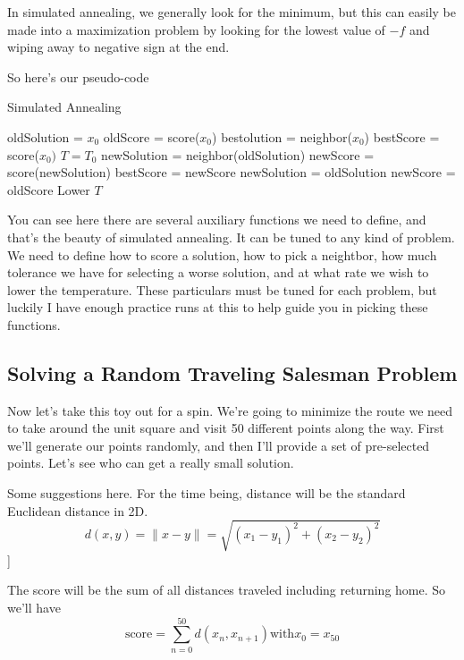 \documentclass{article}
\theoremstyle{definition}
\theoremstyle{remark}
\begin{document}
In simulated annealing, we generally look for the minimum, but this can easily be made into a maximization problem by looking for the lowest value of $-f$ and wiping away to negative sign at the end.


So here's our pseudo-code
\begin{algorithm}
	\caption{Simulated Annealing}
	\label{SA}
	\begin{algorithmic}[1]
		\State oldSolution = $x_0$
		\State oldScore = score($x_0$)
		\State bestolution = neighbor($x_0$)
		\State bestScore = score($x_0)$
		\State $T = T_0$
		\State newSolution = neighbor(oldSolution)
		\State newScore = score(newSolution)
	    \State bestScore = newScore
	    \EndIf
	    \State newSolution = oldSolution
	    \State newScore = oldScore
	    \EndIf
	    \EndFor
	    \State Lower $T$
	    \EndWhile
		\EndProcedure
	\end{algorithmic}	
\end{algorithm}   


You can see here there are several auxiliary functions we need to define, and that's the beauty of simulated annealing.  It can be tuned to any kind of problem.  We need to define how to score a solution, how to pick a neightbor, how much tolerance we have for selecting a worse solution, and at what rate we wish to lower the temperature.  These particulars must be tuned for each problem, but luckily I have enough practice runs at this to help guide you in picking these functions.


\subsection{Solving a Random Traveling Salesman Problem}

Now let's take this toy out for a spin.  We're going to minimize the route we need to take around the unit square and visit 50 different points along the way.  First we'll generate our points randomly, and then I'll provide a set of pre-selected points.  Let's see who can get a really small solution.

Some suggestions here. For the time being, distance will be the standard Euclidean distance in 2D.
\[
d(x,y) = \|x-y\| = \sqrt{(x_1-y_1)^2 + (x_2-y_2)^2}
\]]

The score will be the sum of all distances traveled including returning home.
So we'll have
\[
 \text{score} = \sum_{n=0}^{50} d(x_n,x_{n+1}) \text{with} x_0 = x_{50}
\]
\end{document}
